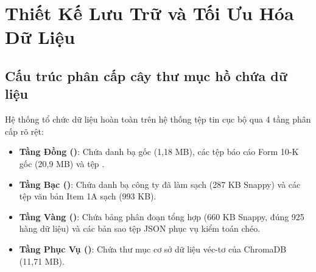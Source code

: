 \section{Thiết Kế Lưu Trữ và Tối Ưu Hóa Dữ Liệu}

\subsection{Cấu trúc phân cấp cây thư mục hồ chứa dữ liệu}
Hệ thống tổ chức dữ liệu hoàn toàn trên hệ thống tệp tin cục bộ qua 4 tầng phân cấp rõ rệt:
\begin{itemize}
    \item \textbf{Tầng Đồng ()}: Chứa danh bạ gốc  (1,18 MB), các tệp báo cáo Form 10-K gốc  (20,9 MB) và tệp .
    \item \textbf{Tầng Bạc ()}: Chứa danh bạ công ty đã làm sạch  (287 KB Snappy) và các tệp văn bản Item 1A sạch  (993 KB).
    \item \textbf{Tầng Vàng ()}: Chứa bảng phân đoạn tổng hợp  (660 KB Snappy, đúng 925 hàng dữ liệu) và các bản sao tệp JSON phục vụ kiểm toán chéo.
    \item \textbf{Tầng Phục Vụ ()}: Chứa thư mục cơ sở dữ liệu véc-tơ  của ChromaDB (11,71 MB).
\end{itemize}

